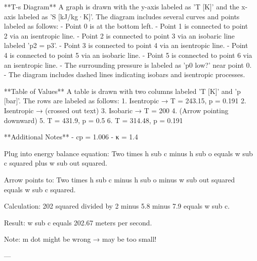 **T-s Diagram**  
A graph is drawn with the y-axis labeled as 'T [K]' and the x-axis labeled as 'S [kJ/kg·K]'. The diagram includes several curves and points labeled as follows:  
- Point 0 is at the bottom left.  
- Point 1 is connected to point 2 via an isentropic line.  
- Point 2 is connected to point 3 via an isobaric line labeled 'p2 = p3'.  
- Point 3 is connected to point 4 via an isentropic line.  
- Point 4 is connected to point 5 via an isobaric line.  
- Point 5 is connected to point 6 via an isentropic line.  
- The surrounding pressure is labeled as 'p0 low?' near point 0.  
- The diagram includes dashed lines indicating isobars and isentropic processes.  

**Table of Values**  
A table is drawn with two columns labeled 'T [K]' and 'p [bar]'. The rows are labeled as follows:  
1. Isentropic → T = 243.15, p = 0.191  
2. Isentropic → (crossed out text)  
3. Isobaric → T = 200  
4. (Arrow pointing downward)  
5. T = 431.9, p = 0.5  
6. T = 314.48, p = 0.191  

**Additional Notes**  
- cp = 1.006  
- κ = 1.4

Plug into energy balance equation:  
Two times h sub c minus h sub o equals w sub c squared plus w sub out squared.  

Arrow points to:  
Two times h sub c minus h sub o minus w sub out squared equals w sub c squared.  

Calculation:  
202 squared divided by 2 minus 5.8 minus 7.9 equals w sub c.  

Result:  
w sub c equals 202.67 meters per second.  

Note:  
m dot might be wrong → may be too small!  

---